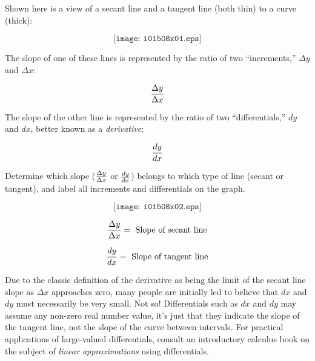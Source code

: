 

Shown here is a view of a secant line and a tangent line (both thin) to a curve (thick):

$$\texttt{[image: i01508x01.eps]}$$

The slope of one of these lines is represented by the ratio of two ``increments,'' $\Delta y$ and $\Delta x$:

$${\Delta y \over \Delta x}$$

\vskip 10pt

The slope of the other line is represented by the ratio of two ``differentials,'' $dy$ and $dx$, better known as a {\it derivative}:

$${dy \over dx}$$

\vskip 10pt

Determine which slope ($\Delta y \over \Delta x$ or $dy \over dx$) belongs to which type of line (secant or tangent), and label all increments and differentials on the graph.







$$\texttt{[image: i01508x02.eps]}$$

$${\Delta y \over \Delta x} = \hbox{ Slope of secant line}$$

\vskip 10pt

$${dy \over dx} = \hbox{ Slope of tangent line}$$

\vskip 10pt

Due to the classic definition of the derivative as being the limit of the secant line slope as $\Delta x$ approaches zero, many people are initially led to believe that $dx$ and $dy$ must necessarily be very small.  Not so!  Differentials such as $dx$ and $dy$ may assume any non-zero real number value, it's just that they indicate the slope of the tangent line, not the slope of the curve between intervals.  For practical applications of large-valued differentials, consult an introductory calculus book on the subject of {\it linear approximations} using differentials.












